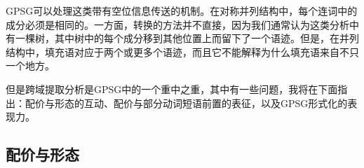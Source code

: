 \ex
[*]{
\gll The kennel (in) which Mary made and Fido sleeps has been stolen.\hspace{-2pt}\\
\textsc{det} 狗窝 \hspaceThis{(}\textsc{prep} \textsc{rel} Mary 做 和 Fido 睡觉 \textsc{aux} \passive{} 偷\\\jambox{(= S/NP \& S/PP)}
}
\zl
GPSG可以处理这类带有空位信息传送的机制。在对称并列结构中，每个连词中的\slaschc 成分必须是相同的。一方面，转换的方法并不直接，因为我们通常认为这类分析中有一棵树，其中树中的每个成分移到其他位置上而留下了一个语迹。但是，在并列结构中，填充语对应于两个或更多个语迹，而且它不能解释为什么填充语来自不只一个地方。

但是跨域提取分析是GPSG中的一个重中之重，其中有一些问题，我将在下面指出：配价与形态的互动、配价与部分动词短语前置的表征，以及GPSG形式化的表现力。

\subsection{配价与形态}

